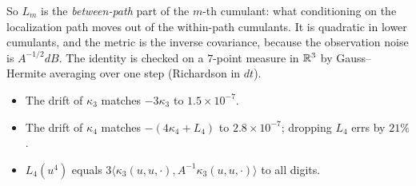 So $L_m$ is the \emph{between-path} part of the $m$-th cumulant: what conditioning on the localization path moves out of the
within-path cumulants. It is quadratic in lower cumulants, and the metric is the inverse covariance, because the observation noise is
$A^{-1/2}dB$. The identity is checked on a $7$-point measure in $\mathbb R^3$ by Gauss--Hermite averaging over one step (Richardson
in $dt$).
\begin{itemize}[leftmargin=*]
\item The drift of $\kappa_3$ matches $-3\kappa_3$ to $1.5\times10^{-7}$.
\item The drift of $\kappa_4$ matches $-(4\kappa_4+L_4)$ to $2.8\times10^{-7}$; dropping $L_4$ errs by $21\%$.
\item $L_4(u^4)$ equals $3\langle\kappa_3(u,u,\cdot),A^{-1}\kappa_3(u,u,\cdot)\rangle$ to all digits.
\end{itemize}

